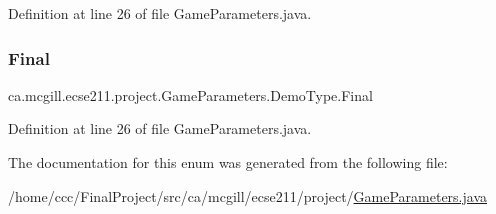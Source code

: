 Definition at line 26 of file Game\+Parameters.\+java.

\mbox{\label{enumca_1_1mcgill_1_1ecse211_1_1project_1_1_game_parameters_1_1_demo_type_a1ba3e060bfd5f76af77b713321abc7f6}} 
\subsubsection{\texorpdfstring{Final}{Final}}
{\footnotesize\ttfamily ca.\+mcgill.\+ecse211.\+project.\+Game\+Parameters.\+Demo\+Type.\+Final}



Definition at line 26 of file Game\+Parameters.\+java.



The documentation for this enum was generated from the following file\+:\begin{DoxyCompactItemize}
\item 
/home/ccc/\+Final\+Project/src/ca/mcgill/ecse211/project/\hyperlink{_game_parameters_8java}{Game\+Parameters.\+java}\end{DoxyCompactItemize}
